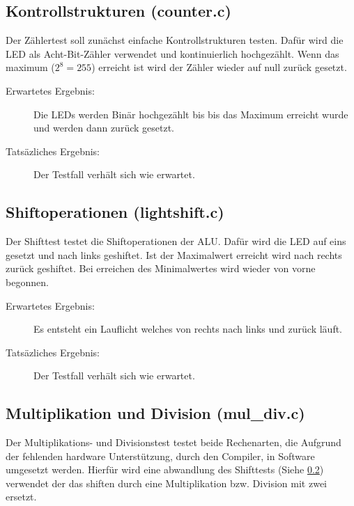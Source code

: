         \subsection{Kontrollstrukturen (counter.c)}\label{lab:counter-test}
            Der Zählertest soll zunächst einfache Kontrollstrukturen testen.
            Dafür wird die LED als Acht-Bit-Zähler verwendet und kontinuierlich hochgezählt.
            Wenn das maximum ($2^8 = 255$) erreicht ist wird der Zähler wieder auf null zurück gesetzt.

            \begin{description}
                \item[Erwartetes Ergebnis:] Die LEDs werden Binär hochgezählt bis
                bis das Maximum erreicht wurde und werden dann zurück gesetzt.
                \item[Tatsäzliches Ergebnis:] Der Testfall verhält sich wie erwartet.
            \end{description}


        \subsection{Shiftoperationen (lightshift.c)}\label{lab:lightshift-test}
            Der Shifttest testet die Shiftoperationen der ALU.
            Dafür wird die LED auf eins gesetzt und nach links geshiftet.
            Ist der Maximalwert erreicht wird nach rechts zurück geshiftet.
            Bei erreichen des Minimalwertes wird wieder von vorne begonnen.

            \begin{description}
                \item[Erwartetes Ergebnis:] Es entsteht ein Lauflicht welches von
                rechts nach links und zurück läuft.
                \item[Tatsäzliches Ergebnis:] Der Testfall verhält sich wie erwartet.
            \end{description}

        \subsection{Multiplikation und Division (mul\_div.c)}
            Der Multiplikations- und Divisionstest testet beide Rechenarten, die
            Aufgrund der fehlenden hardware Unterstützung, durch den Compiler, in
            Software umgesetzt werden. Hierfür wird eine abwandlung des Shifttests
            (Siehe \ref{lab:lightshift-test}) verwendet der das shiften
            durch eine Multiplikation bzw. Division mit zwei ersetzt.

